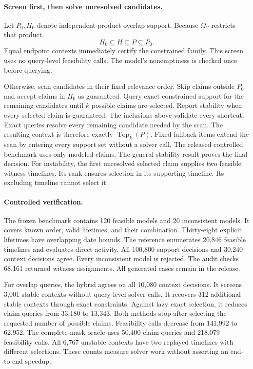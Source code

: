 \paragraph{Screen first, then solve unresolved candidates.}
Let $P_0,H_0$ denote independent-product overlap support.
Because $\Omega_{\mathcal C}$ restricts that product,
\[
 H_0\subseteq H\subseteq P\subseteq P_0.
\]
Equal endpoint contexts immediately certify the constrained family.
This screen uses no query-level feasibility calls.
The model's nonemptiness is checked once before querying.

Otherwise, scan candidates in their fixed relevance order.
Skip claims outside $P_0$ and accept claims in $H_0$ as guaranteed.
Query exact constrained support for the remaining candidates until $k$ possible claims are selected.
Report stability when every selected claim is guaranteed.
The inclusions above validate every shortcut.
Exact queries resolve every remaining candidate needed by the scan.
The resulting context is therefore exactly $\operatorname{Top}_k(P)$.
Fixed fallback items extend the scan by entering every support set without a solver call.
The released controlled benchmark uses only modeled claims.
The general stability result proves the final decision.
For instability, the first unresolved selected claim supplies two feasible witness timelines.
Its rank ensures selection in its supporting timeline.
Its excluding timeline cannot select it.

\paragraph{Controlled verification.}
The frozen benchmark contains 120 feasible models and 20 inconsistent models.
It covers known order, valid lifetimes, and their combination.
Thirty-eight explicit lifetimes have overlapping date bounds.
The reference enumerates 20,846 feasible timelines and evaluates direct activity.
All 100,800 support decisions and 30,240 context decisions agree.
Every inconsistent model is rejected.
The audit checks 68,161 returned witness assignments.
All generated cases remain in the release.

For overlap queries, the hybrid agrees on all 10,080 context decisions.
It screens 3,001 stable contexts without query-level solver calls.
It recovers 312 additional stable contexts through exact constraints.
Against lazy exact selection, it reduces claim queries from 33,180 to 13,343.
Both methods stop after selecting the requested number of possible claims.
Feasibility calls decrease from 141,992 to 62,952.
The complete-mask oracle uses 50,400 claim queries and 218,079 feasibility calls.
All 6,767 unstable contexts have two replayed timelines with different selections.
These counts measure solver work without asserting an end-to-end speedup.

